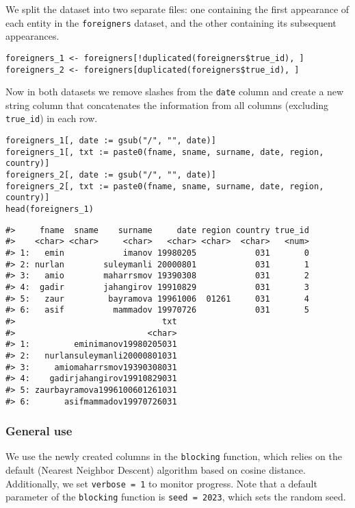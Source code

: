 We split the dataset into two separate files: one containing the first
appearance of each entity in the \texttt{foreigners} dataset, and the other
containing its subsequent appearances.

\begin{verbatim}
foreigners_1 <- foreigners[!duplicated(foreigners$true_id), ]
foreigners_2 <- foreigners[duplicated(foreigners$true_id), ]
\end{verbatim}

Now in both datasets we remove slashes from the \texttt{date} column and create
a new string column that concatenates the information from all columns
(excluding \texttt{true\_id}) in each row.

\begin{verbatim}
foreigners_1[, date := gsub("/", "", date)]
foreigners_1[, txt := paste0(fname, sname, surname, date, region, country)]
foreigners_2[, date := gsub("/", "", date)]
foreigners_2[, txt := paste0(fname, sname, surname, date, region, country)]
head(foreigners_1)
\end{verbatim}

\begin{verbatim}
#>     fname  sname    surname     date region country true_id
#>    <char> <char>     <char>   <char> <char>  <char>   <num>
#> 1:   emin            imanov 19980205            031       0
#> 2: nurlan        suleymanli 20000801            031       1
#> 3:   amio        maharrsmov 19390308            031       2
#> 4:  gadir        jahangirov 19910829            031       3
#> 5:   zaur         bayramova 19961006  01261     031       4
#> 6:   asif          mammadov 19970726            031       5
#>                              txt
#>                           <char>
#> 1:         eminimanov19980205031
#> 2:   nurlansuleymanli20000801031
#> 3:     amiomaharrsmov19390308031
#> 4:    gadirjahangirov19910829031
#> 5: zaurbayramova1996100601261031
#> 6:       asifmammadov19970726031
\end{verbatim}

\subsubsection{General use}\label{general-use}

We use the newly created columns in the \texttt{blocking} function, which
relies on the default  (Nearest Neighbor Descent)
algorithm based on cosine distance. Additionally, we set \texttt{verbose\ =\ 1}
to monitor progress. Note that a default parameter of the \texttt{blocking}
function is \texttt{seed\ =\ 2023}, which sets the random seed.

